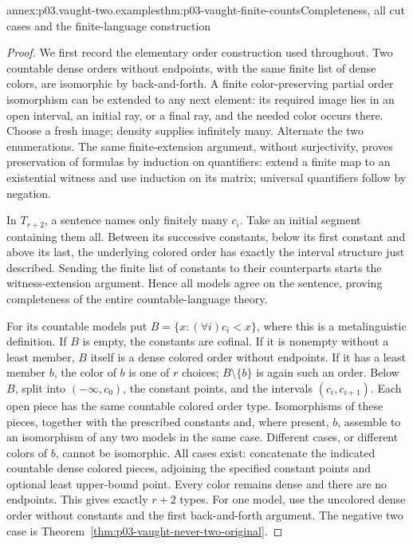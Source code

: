 \begin{annexitem}{annex:p03.vaught-two.examples}{thm:p03-vaught-finite-counts}{Completeness, all cut cases and the finite-language construction}
\begin{proof}
We first record the elementary order construction used throughout. Two
countable dense orders without endpoints, with the same finite list of dense
colors, are isomorphic by back-and-forth. A finite color-preserving partial
order isomorphism can be extended to any next element: its required image
lies in an open interval, an initial ray, or a final ray, and the needed
color occurs there. Choose a fresh image; density supplies infinitely many.
Alternate the two enumerations. The same finite-extension argument, without
surjectivity, proves preservation of formulas by induction on quantifiers:
extend a finite map to an existential witness and use induction on its
matrix; universal quantifiers follow by negation.

In \(T_{r+2}\), a sentence names only finitely many \(c_i\). Take an
initial segment containing them all. Between its successive constants,
below its first constant and above its last, the underlying colored order
has exactly the interval structure just described. Sending the finite list
of constants to their counterparts starts the witness-extension argument.
Hence all models agree on the sentence, proving completeness of the entire
countable-language theory.

For its countable models put \(B=\{x:(\forall i)c_i<x\}\), where this
is a metalinguistic definition. If \(B\) is empty, the constants are
cofinal. If it is nonempty without a least member, \(B\) itself is a
dense colored order without endpoints. If it has a least member \(b\),
the color of \(b\) is one of \(r\) choices; \(B\setminus\{b\}\)
is again such an order. Below \(B\), split into
\(( -\infty,c_0)\), the constant points, and the intervals
\((c_i,c_{i+1})\). Each open piece has the same countable colored order
type. Isomorphisms of these pieces, together with the prescribed constants
and, where present, \(b\), assemble to an isomorphism of any two models
in the same case. Different cases, or different colors of \(b\), cannot
be isomorphic. All cases exist: concatenate the indicated countable dense
colored pieces, adjoining the specified constant points and optional least
upper-bound point. Every color remains dense and there are no endpoints.
This gives exactly \(r+2\) types. For one model, use the uncolored dense
order without constants and the first back-and-forth argument. The negative
two case is Theorem~\ref{thm:p03-vaught-never-two-original}.


\end{proof}
\end{annexitem}
